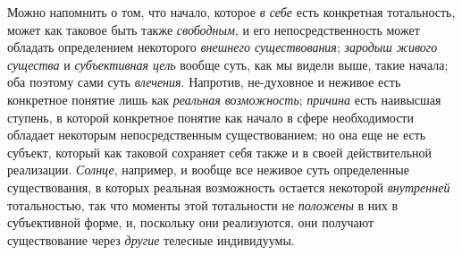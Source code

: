 {{Можно напомнить о том, что начало, которое {\em в себе} есть
конкретная тотальность, может как таковое быть также {\em свободным}, и его
непосредственность может обладать определением некоторого
{\em внешнего существования};
{\em зародыш живого существа} и {\em субъективная цель}
вообще суть, как мы видели выше, такие начала; оба поэтому
сами суть {\em влечения}.
Напротив, не-духовное и неживое есть конкретное понятие лишь
как {\em реальная возможность}; {\em причина} есть
наивысшая ступень, в которой конкретное понятие как начало в сфере
необходимости обладает некоторым непосредственным существованием; но она
еще не есть субъект, который как таковой сохраняет себя также и в своей
действительной реализации. {\em Солнце}, например, и
вообще все неживое суть определенные существования, в которых реальная
возможность остается некоторой {\em внутренней}
тотальностью, так что моменты этой тотальности не
{\em положены}
в них в субъективной форме, и, поскольку они реализуются, они
получают существование через {\em другие} телесные индивидуумы.

}}
